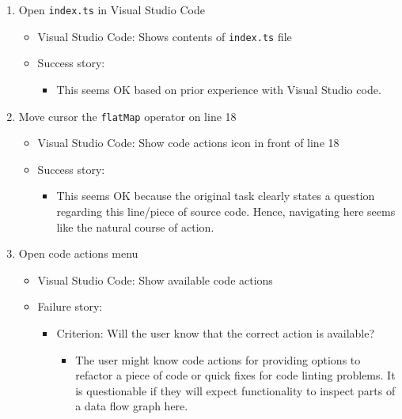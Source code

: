 \documentclass[sigplan,screen,nonacm,review]{acmart}
\begin{document}
\begin{enumerate}
	\item Open \texttt{index.ts} in Visual Studio Code
	      \begin{itemize}
	      	\item Visual Studio Code: Shows contents of \texttt{index.ts} file
	      	\item Success story:
	      	      \begin{itemize}
	      	      	\item This seems OK based on prior experience with Visual Studio code.
	      	      \end{itemize}
	      \end{itemize}

	\item Move cursor the \texttt{flatMap} operator on line 18
	      \begin{itemize}
	      	\item Visual Studio Code: Show code actions icon in front of line 18
	      	\item Success story:
	      	      \begin{itemize}
	      	      	\item This seems OK because the original task clearly states a question regarding this line/piece of source code. Hence, navigating here seems like the natural course of action.
	      	      \end{itemize}
	      \end{itemize}

	\item Open code actions menu
	      \begin{itemize}
	      	\item Visual Studio Code: Show available code actions
	      	\item Failure story:
	      	      \begin{itemize}
	      	      	\item Criterion: Will the user know that the correct action is available?
	      	      	      \begin{itemize}
	      	      	      	\item The user might know code actions for providing options to refactor a piece of code or quick fixes for code linting problems. It is questionable if they will expect functionality to inspect parts of a data flow graph here.
	      	      	      \end{itemize}
	      	      \end{itemize}
	      \end{itemize}


\end{enumerate}
\end{document}
